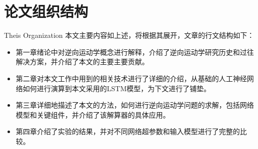 \section{论文组织结构}{Theis Organization}
本文主要内容如上述，将根据其展开，文章的行文结构如下：
\begin{itemize}
  \item 第一章绪论中对逆向运动学概念进行解释，介绍了逆向运动学研究历史和过往解决方案，并介绍了本文的主要主要贡献。
  \item 第二章对本文工作中用到的相关技术进行了详细的介绍，从基础的人工神经网络如何进行演算到本文采用的LSTM模型，为下文进行了铺垫。
  \item 第三章详细地描述了本文的方法，如何进行逆向运动学问题的求解，包括网络模型和关键组件，并介绍了该解算器的具体应用。
  \item 第四章介绍了实验的结果，并对不同网络超参数和输入模型进行了完整的比较。
\end{itemize}
\\ \hspace*{\fill} \\
\\ \hspace*{\fill} \\
\\ \hspace*{\fill} \\
\\ \hspace*{\fill} \\
\\ \hspace*{\fill} \\
\\ \hspace*{\fill} \\
\\ \hspace*{\fill} \\
\\ \hspace*{\fill} \\
\\ \hspace*{\fill} \\
\\ \hspace*{\fill} \\
\\ \hspace*{\fill} \\
\\ \hspace*{\fill} \\
